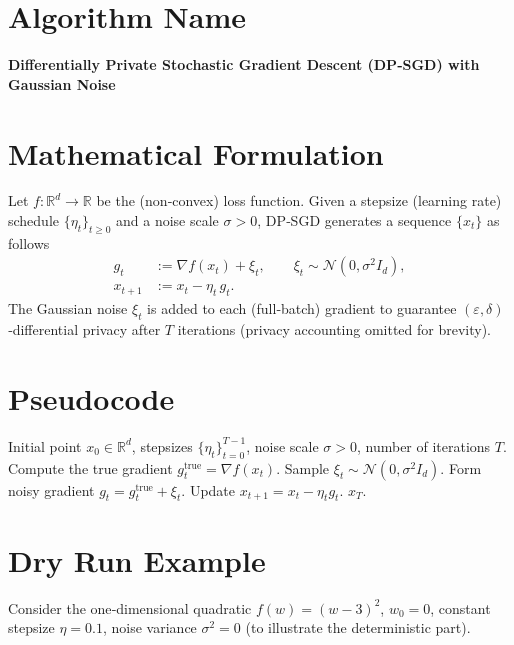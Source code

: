 \documentclass{article}
\begin{document}
\section*{Algorithm Name}
\textbf{Differentially Private Stochastic Gradient Descent (DP‑SGD) with Gaussian Noise}

\section*{Mathematical Formulation}
Let $f:\mathbb{R}^{d}\rightarrow\mathbb{R}$ be the (non‑convex) loss function.  
Given a stepsize (learning rate) schedule $\{\eta_{t}\}_{t\ge 0}$ and a noise scale $\sigma>0$, DP‑SGD generates a sequence $\{x_{t}\}$ as follows
\[
\boxed{
\begin{aligned}
g_{t} &:= \nabla f(x_{t}) + \xi_{t}, \qquad \xi_{t}\sim\mathcal{N}\!\left(0,\sigma^{2}I_{d}\right),\\[4pt]
x_{t+1} &:= x_{t} - \eta_{t}\, g_{t}.
\end{aligned}}
\]
The Gaussian noise $\xi_{t}$ is added to each (full‑batch) gradient to guarantee $(\varepsilon,\delta)$‑differential privacy after $T$ iterations (privacy accounting omitted for brevity).

\section*{Pseudocode}
\begin{algorithm}[H]
\caption{DP‑SGD with Gaussian noise}
\begin{algorithmic}[1]
\REQUIRE Initial point $x_{0}\in\mathbb{R}^{d}$, stepsizes $\{\eta_{t}\}_{t=0}^{T-1}$, noise scale $\sigma>0$, number of iterations $T$.
    \STATE Compute the true gradient $g^{\text{true}}_{t}= \nabla f(x_{t})$.
    \STATE Sample $\xi_{t}\sim\mathcal{N}(0,\sigma^{2}I_{d})$.
    \STATE Form noisy gradient $g_{t}= g^{\text{true}}_{t}+\xi_{t}$.
    \STATE Update $x_{t+1}=x_{t}-\eta_{t} g_{t}$.
\ENDFOR
\RETURN $x_{T}$.
\end{algorithmic}
\end{algorithm}

\section*{Dry Run Example}
Consider the one‑dimensional quadratic $f(w)=(w-3)^{2}$, $w_{0}=0$, constant stepsize $\eta=0.1$, noise variance $\sigma^{2}=0$ (to illustrate the deterministic part).  
\end{document}
